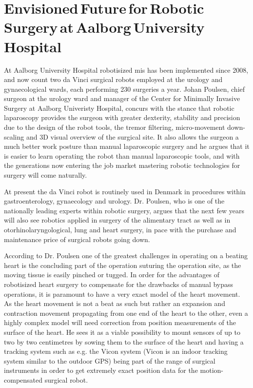 \section[Envisioned Future for Robotic Surgery at Aalborg University Hospital]{Envisioned\,Future\,for\,Robotic\,Surgery\,at\,Aalborg\,University\,Hospital}\label{sec:aau_doc}

At Aalborg University Hospital robotisized \gls{mis} has been implemented since 2008, and now count two da Vinci surgical robots employed at the urology and gynaecological wards, each performing 230 surgeries a year. %
Johan Poulsen, chief surgeon at the urology ward and manager of the Center for Minimally Invasive Surgery at Aalborg Univeristy Hospital, concurs with the stance that robotic laparoscopy provides the surgeon with greater dexterity, stability and precision due to the design of the robot tools, the tremor filtering, micro-movement down-scaling %
and 3D visual overview of the surgical site.  %
It also allows the surgeon a much better work posture than manual laparoscopic surgery and he argues that it is easier to learn operating the robot than manual laparoscopic tools, %
and with the generations now entering the job market mastering  robotic technologies for surgery will come naturally.


At present the da Vinci robot is routinely used in Denmark in procedures within gastroenterology, gynaecology and urology. Dr. Poulsen, who is one of the nationally leading experts within robotic surgery, argues that the next few years will also see robotics applied in surgery of the alimentary tract as well as in otorhinolaryngological, lung and heart surgery, in pace with the purchase and maintenance price of surgical robots going down.

According to Dr. Poulsen one of the greatest challenges in operating on a beating heart is the concluding part of the operation suturing the operation site, as the moving tissue is easily pinched or tugged. 
In order for the advantages of robotisized heart surgery to compensate for the drawbacks of manual bypass operations, it is paramount to have a very exact model of the heart movement. 
As the heart movement is not a beat as such but rather an expansion and contraction movement propagating from one end of the heart to the other, even a highly complex model will need correction from position measurements of the surface of the heart. 
He sees it as a viable possibility to mount sensors of up to two by two centimetres by sowing them to the surface of the heart and having a tracking system such as e.g. the Vicon system (Vicon is an indoor tracking system similar to the outdoor GPS) being part of the range of surgical instruments in order to get extremely exact position data for the motion-compensated surgical robot.


